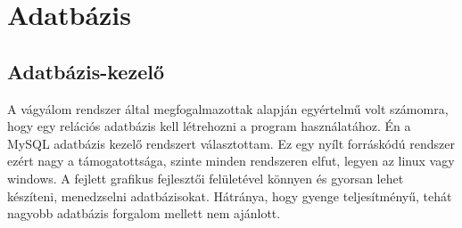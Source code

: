 \documentclass[
]{thesis-ekf}
\theoremstyle{definition}
\theoremstyle{remark}
\begin{document}
\section {Adatbázis}
\subsection{Adatbázis-kezelő}
A vágyálom rendszer által megfogalmazottak alapján egyértelmű volt számomra, hogy egy relációs adatbázis kell létrehozni a program használatához. Én a MySQL adatbázis kezelő rendszert választottam. Ez egy nyílt forráskódú rendszer ezért nagy a támogatottsága, szinte minden rendszeren elfut, legyen az linux vagy windows. A fejlett grafikus fejlesztői felületével könnyen és gyorsan lehet készíteni, menedzselni adatbázisokat. Hátránya, hogy gyenge teljesítményű, tehát nagyobb adatbázis forgalom mellett nem ajánlott.
\end{document}
